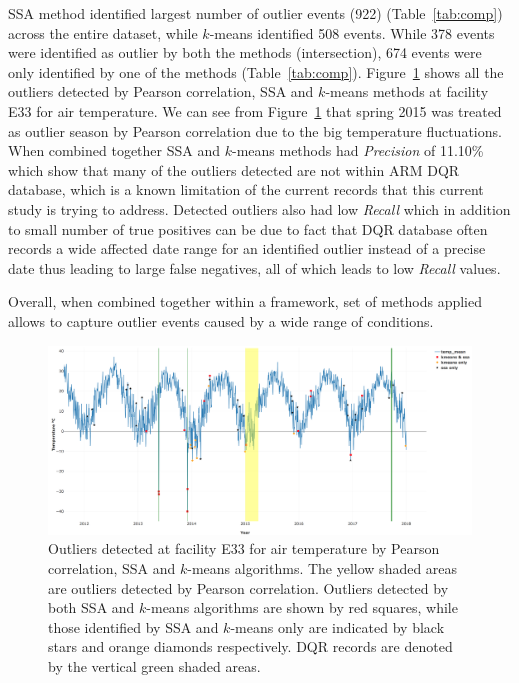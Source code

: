 SSA method identified largest number of outlier events (922)
(Table~\ref{tab:comp}) across the entire dataset, while $k$-means
identified 508 events. While 378 events were identified as outlier by
both the methods (intersection), 674 events were only identified by one
of the methods (Table~\ref{tab:comp}).
Figure~\ref{fig:combined} shows all the outliers detected by Pearson correlation, SSA and
$k$-means methods at facility E33 for air temperature. We can see from Figure~\ref{fig:combined}
that spring 2015 was treated as outlier season by Pearson correlation due to the big 
temperature fluctuations. When combined together SSA and $k$-means methods had
\textit{Precision} of 11.10\% which show that many of the outliers
detected are not within ARM DQR database, which is a known limitation of
the current records that this current study is trying to address.
Detected outliers also had low \textit{Recall} which in addition to small
number of true positives can be due to fact that DQR database often
records a wide affected date range for an identified outlier instead of a
precise date thus leading to large false negatives, all of which leads
to low \textit{Recall} values.

Overall, when combined together within a framework, set of methods applied allows
to capture outlier events caused by a wide range of conditions. 

\begin{figure}[ht]
    \centering
    \includegraphics[width=\textwidth]{figures/combined.png}
    \caption{Outliers detected at facility E33 for air temperature
		by Pearson correlation, SSA and $k$-means algorithms. The yellow shaded areas are
		outliers detected by Pearson correlation. Outliers detected by both SSA and $k$-means
		algorithms are shown by red squares, while those identified by
		SSA and $k$-means only are indicated by black stars and orange
		diamonds respectively. DQR records are denoted by the vertical green shaded areas.}
    \label{fig:combined}
\end{figure}
